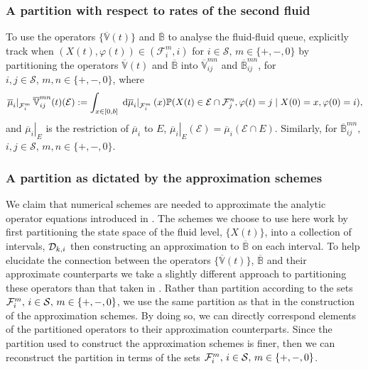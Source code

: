 \subsubsection{A partition with respect to rates of the second fluid}
To use the operators \(\{ \overline{\mathbb  V}(t)\}\) and \( \overline{\mathbb  B}\) to analyse the fluid-fluid queue, \cite{bo2014} explicitly track when \((X(t),\varphi(t))\in(\mathcal F_i^m,i)\) for \(i\in\mathcal S,\, m \in \{+,-,0\}\) by partitioning the operators \( \overline{\mathbb  V}(t)\) and \( \overline{\mathbb  B}\) into \( \overline{\mathbb  V}_{ij}^{m n}\) and \( \overline{\mathbb  B}_{ij}^{m n}\), for \(i,j\in\mathcal S,\, m,n\in \{+,-,0\}\), where
\[\left.\overline\mu_i\right|_{\mathcal{F}_i^m}  \overline{\mathbb  V}_{ij}^{m n}(t)(\mathcal{E}) := \int_{x\in[0,b]} \left. \, \mathrm{d} \overline\mu_i\right|_{\mathcal{F}_i^m}(x)\mathbb P (X(t) \in\mathcal{E}\cap \mathcal{F}_j^n,\varphi(t) = j \mid X(0) = x, \varphi(0) = i),\]
and \(\left.\overline\mu_i\right|_{E}\) is the restriction of \(\overline\mu_i\) to \(E\), \(\left.\overline\mu_i\right|_{E}(\mathcal E)=\overline\mu_i(\mathcal E\cap E)\). Similarly, for \( \overline{\mathbb  B}_{ij}^{m n},\) \(i,j\in\mathcal S,\, m,n\in \{+,-,0\}\).

\subsubsection{A partition as dictated by the approximation schemes}
We claim that numerical schemes are needed to approximate the analytic operator equations introduced in \cite{bo2014}. The schemes we choose to use here work by first partitioning the state space of the fluid level, \(\{X(t)\}\), into a collection of intervals, \({\mathcal{D}_{k,i}}\) then constructing an approximation to \(\overline{\mathbb B}\) on each interval. To help elucidate the connection between the operators \(\{ \overline{\mathbb  V}(t)\}\), \( \overline{\mathbb  B}\) and their approximate counterparts we take a slightly different approach to partitioning these operators than that taken in \cite{bo2014}. Rather than partition according to the sets \(\mathcal{F}_i^m,\,i\in\mathcal{S},\,m\in\{+,-,0\}\), we use the same partition as that in the construction of the approximation schemes. By doing so, we can directly correspond elements of the partitioned operators to their approximation counterparts. Since the partition used to construct the approximation schemes is finer, then we can reconstruct the partition in terms of the sets \(\mathcal{F}_i^m,\,i\in\mathcal{S},\,m\in\{+,-,0\}\). 

